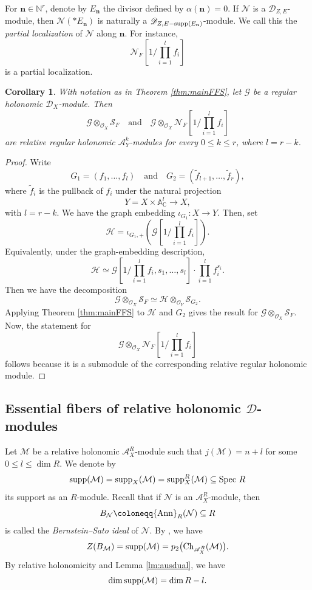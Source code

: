 \documentclass{amsart}
\theoremstyle{plain}
\numberwithin{theorem}{section}
\newtheorem{coro}[theorem]{Corollary}
\theoremstyle{definition}
\theoremstyle{remark}
\theoremstyle{definition}
\newcommand{\A}{\mathbb{A}}
\newcommand{\C}{\mathbb{C}} %
\newcommand{\N}{\mathbb{N}}
\newcommand{\cG}{\mathcal{G}}
\newcommand{\cH}{\mathcal{H}}
\newcommand{\cM}{\mathcal{M}}
\newcommand{\cN}{\mathcal{N}}
\newcommand{\cO}{\mathscr{O}}
\newcommand{\cS}{\mathcal{S}}
\newcommand{\bn}{\mathbf{n}}
\newcommand{\sA}{\mathscr{A}}
\newcommand{\shD}{\mathscr{D}}
\newcommand{\Spec}{\textup{Spec }}
\newcommand{\supp}{\textup{supp}}
\newcommand{\Ann}{{\textup{Ann}}}
\newcommand{\Ch}{\textup{Ch}}
\begin{document}
For $\bn\in \N^r$, denote by $E_\bn$ the divisor defined by
$\alpha(\bn)=0$. If $\cN$ is a $\shD_{Z,E}$-module, then
$\cN(*E_\bn)$ is naturally a $\shD_{Z,E-\supp(E_\bn)}$-module. We call this
the \emph{partial localization} of $\cN$ along $\bn$. For instance,
\[
\cN_F\left[1/\prod_{i=1}^l f_i\right]
\]
is a partial localization.

\begin{coro}\label{cor:factorthroughgraph}
With notation as in Theorem \ref{thm:mainFFS}, let $\cG$ be a regular
holonomic $\shD_X$-module. Then
\[
\cG\otimes_{\cO_X}\cS_F
\quad \text{and} \quad
\cG\otimes_{\cO_X}
\cN_F\left[1/\prod_{i=1}^l f_i\right]
\]
are relative regular holonomic $\sA_Y^k$-modules for every $0\le k\le r$,
where $l=r-k$.
\end{coro}

\begin{proof}
Write
\[
G_1=(f_1,\dots,f_l)
\quad \text{and} \quad
G_2=(\tilde f_{l+1},\dots,\tilde f_r),
\]
where $\tilde f_i$ is the pullback of $f_i$ under the natural projection
\[
Y=X\times \A_\C^l\to X,
\]
with $l=r-k$. We have the graph embedding
$\iota_{G_1}\colon X\longrightarrow Y.$
Then, set
\[
\cH
=
\iota_{G_1,+}
\left(
\cG\left[1/\prod_{i=1}^l f_i\right]
\right).
\]
Equivalently, under the graph-embedding description,
\[
\cH
\simeq
\cG\left[
1/\prod_{i=1}^l f_i,
s_1,\dots,s_l
\right]\cdot
\prod_{i=1}^l f_i^{s_i}.
\]
Then we have the decomposition
\[
\cG\otimes_{\cO_X}\cS_F
\simeq
\cH\otimes_{\cO_Y}\cS_{G_2}.
\]
Applying Theorem \ref{thm:mainFFS} to $\cH$ and $G_2$ gives the result for
$\cG\otimes_{\cO_X}\cS_F$. Now, the statement for
\[
\cG\otimes_{\cO_X}
\cN_F\left[1/\prod_{i=1}^l f_i\right]
\] 
follows because it is a submodule of the corresponding relative regular
holonomic module.
\end{proof}

\subsection{Essential fibers of relative holonomic $\shD$-modules}

Let $\cM$ be a relative holonomic $\sA_X^R$-module such that
$j(\cM)=n+l$ for some $0\le l\le \dim R$. We denote by
\[
\supp(\cM)=\supp_X(\cM)=\supp_X^R(\cM)\subseteq \Spec R
\]
its support as an $R$-module. Recall that if $\cN$ is an $\sA_X^R$-module, then
\[
B_\cN\coloneqq \Ann_R(\cN)\subseteq R
\]
is called the \emph{Bernstein--Sato ideal} of $\cN$. By
\cite[Lem.3.4.1]{BVWZ}, we have
\begin{equation}\label{eq:suppbideal=}
    Z(B_\cM)=\supp(\cM)=p_2\big(\Ch_{\sA_X^R}(\cM)\big).
\end{equation}
By relative holonomicity and Lemma \ref{lm:ausdual}, we have
\[
\dim \supp(\cM)=\dim R-l.
\]
\end{document}
